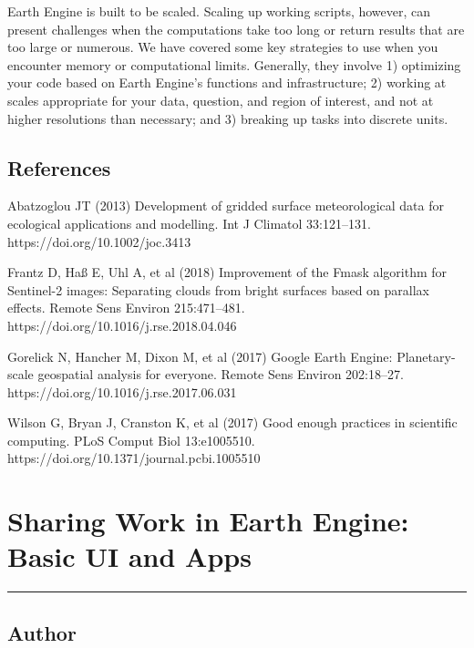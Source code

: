 \documentclass[
  letterpaper,
  DIV=11,
  numbers=noendperiod]{scrreprt}
\begin{document}

Earth Engine is built to be scaled. Scaling up working scripts, however,
can present challenges when the computations take too long or return
results that are too large or numerous. We have covered some key
strategies to use when you encounter memory or computational limits.
Generally, they involve 1) optimizing your code based on Earth Engine's
functions and infrastructure; 2) working at scales appropriate for your
data, question, and region of interest, and not at higher resolutions
than necessary; and 3) breaking up tasks into discrete units.

\hypertarget{references-16}{%
\section*{References}\label{references-16}}


Abatzoglou JT (2013) Development of gridded surface meteorological data
for ecological applications and modelling. Int J Climatol 33:121--131.
https://doi.org/10.1002/joc.3413

Frantz D, Haß E, Uhl A, et al (2018) Improvement of the Fmask algorithm
for Sentinel-2 images: Separating clouds from bright surfaces based on
parallax effects. Remote Sens Environ 215:471--481.
https://doi.org/10.1016/j.rse.2018.04.046

Gorelick N, Hancher M, Dixon M, et al (2017) Google Earth Engine:
Planetary-scale geospatial analysis for everyone. Remote Sens Environ
202:18--27. https://doi.org/10.1016/j.rse.2017.06.031

Wilson G, Bryan J, Cranston K, et al (2017) Good enough practices in
scientific computing. PLoS Comput Biol 13:e1005510.
https://doi.org/10.1371/journal.pcbi.1005510

\hypertarget{sharing-work-in-earth-engine-basic-ui-and-apps}{%
\chapter{Sharing Work in Earth Engine: Basic UI and
Apps}\label{sharing-work-in-earth-engine-basic-ui-and-apps}}

\begin{center}\rule{0.5\linewidth}{0.5pt}\end{center}

\hypertarget{author-22}{%
\section*{Author}\label{author-22}}
\end{document}
